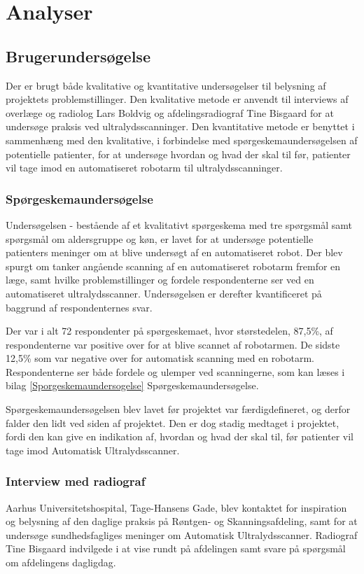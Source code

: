 \chapter{Analyser}\label{Analyser}

\section{Brugerundersøgelse}
Der er brugt både kvalitative og kvantitative undersøgelser til belysning af projektets problemstillinger. Den kvalitative metode er anvendt til interviews af overlæge og radiolog Lars Boldvig og afdelingsradiograf Tine Bisgaard for at undersøge praksis ved ultralydsscanninger. Den kvantitative metode  er benyttet i sammenhæng med den kvalitative, i forbindelse med spørgeskemaundersøgelsen af potentielle patienter, for at undersøge hvordan og hvad der skal til før, patienter vil tage imod en automatiseret robotarm til ultralydsscanninger.  

\subsection{Spørgeskemaundersøgelse}
Undersøgelsen - bestående af et kvalitativt spørgeskema med tre spørgsmål samt spørgsmål om aldersgruppe og køn, er lavet for at undersøge potentielle patienters meninger om at blive undersøgt af en automatiseret robot. Der blev spurgt om tanker angående scanning af en automatiseret  robotarm fremfor en læge, samt hvilke problemstillinger og fordele respondenterne ser ved en automatiseret ultralydsscanner. Undersøgelsen er derefter kvantificeret på baggrund af respondenternes svar. 

Der var i alt 72 respondenter på spørgeskemaet, hvor størstedelen, 87,5\%, af respondenterne var positive over for at blive scannet af robotarmen. De sidste 12,5\% som var negative over for automatisk scanning med en robotarm. Respondenterne ser både fordele og ulemper ved scanningerne, som kan læses i bilag \ref{Sporgeskemaundersogelse} Spørgeskemaundersøgelse.

Spørgeskemaundersøgelsen blev lavet før projektet var færdigdefineret, og derfor falder den lidt ved siden af projektet. Den er dog stadig medtaget i projektet, fordi den kan give en indikation af, hvordan og hvad der skal til, før patienter vil tage imod Automatisk Ultralydsscanner. 

\subsection{Interview med radiograf} 
Aarhus Universitetshospital, Tage-Hansens Gade, blev kontaktet for inspiration og belysning af den daglige praksis på Røntgen- og Skanningsafdeling, samt for at undersøge sundhedsfagliges meninger om Automatisk Ultralydsscanner. Radiograf Tine Bisgaard indvilgede i at vise rundt på afdelingen samt svare på spørgsmål om afdelingens dagligdag. 

